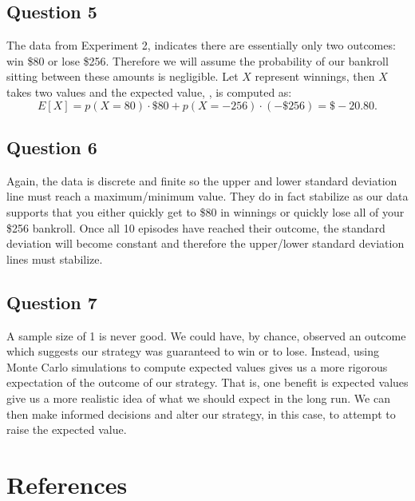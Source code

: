 \documentclass[
	letterpaper, %
]{jdf}
\begin{document}
\subsection{Question 5}
The data from Experiment 2, indicates there are essentially only two outcomes: win \$80 or lose \$256. Therefore we will assume the probability of
our bankroll sitting between these amounts is negligible. Let \(X\) represent winnings, then \(X\) takes two values and the expected value, \cite{wiki:ExpectedValue}, is computed as:
\[
	E[X] = p(X=80)\cdot \$80 + p(X=-256)\cdot(-\$256) =\$-20.80.
\]


\subsection{Question 6}
Again, the data is discrete and finite so the upper and lower standard deviation line must reach a maximum/minimum value.
They do in fact stabilize as our data supports that you either quickly get to \$80 in winnings or quickly lose all of your \$256 bankroll.
Once all 10 episodes have reached their outcome, the standard deviation will become constant and therefore the upper/lower standard deviation lines
must stabilize.

\subsection{Question 7}
A sample size of 1 is never good. We could have, by chance, observed an outcome which suggests our strategy was guaranteed to win or to lose.
Instead, using Monte Carlo simulations to compute expected values gives us a more rigorous expectation of the outcome of our strategy. That is, one benefit
is expected values give us a more realistic idea of what we should expect in the long run. We can then make informed decisions and alter our strategy, in this case,
to attempt to raise the expected value.

\section{References}
\printbibliography[heading=none]
\end{document}
